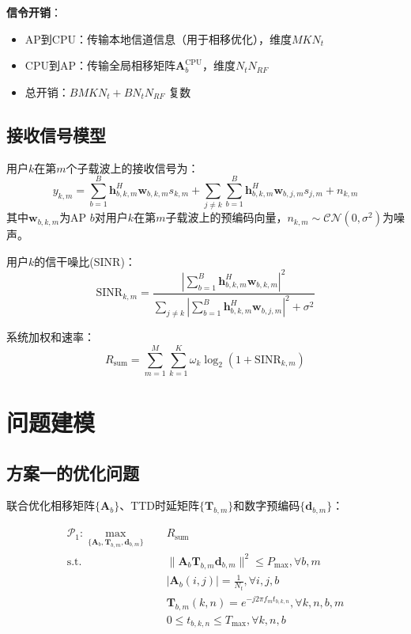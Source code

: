 \documentclass[10pt,twocolumn]{IEEEtran}
\newcommand{\vect}[1]{\mathbf{#1}}
\newcommand{\mat}[1]{\mathbf{#1}}
\begin{document}
\textbf{信令开销}：
\begin{itemize}
\item AP到CPU：传输本地信道信息（用于相移优化），维度$MK N_t$
\item CPU到AP：传输全局相移矩阵$\mat{A}_b^{\text{CPU}}$，维度$N_t N_{RF}$
\item 总开销：$B MK N_t + B N_t N_{RF}$ 复数
\end{itemize}

\subsection{接收信号模型}

用户$k$在第$m$个子载波上的接收信号为：
\begin{equation}
y_{k,m} = \sum_{b=1}^B \vect{h}_{b,k,m}^H \vect{w}_{b,k,m} s_{k,m} + \sum_{j \neq k} \sum_{b=1}^B \vect{h}_{b,k,m}^H \vect{w}_{b,j,m} s_{j,m} + n_{k,m}
\end{equation}
其中$\vect{w}_{b,k,m}$为AP $b$对用户$k$在第$m$子载波上的预编码向量，$n_{k,m} \sim \mathcal{CN}(0, \sigma^2)$为噪声。

用户$k$的信干噪比(SINR)：
\begin{equation}
\text{SINR}_{k,m} = \frac{\left|\sum_{b=1}^B \vect{h}_{b,k,m}^H \vect{w}_{b,k,m}\right|^2}{\sum_{j \neq k}\left|\sum_{b=1}^B \vect{h}_{b,k,m}^H \vect{w}_{b,j,m}\right|^2 + \sigma^2}
\end{equation}

系统加权和速率：
\begin{equation}
R_{\text{sum}} = \sum_{m=1}^M \sum_{k=1}^K \omega_k \log_2(1 + \text{SINR}_{k,m})
\end{equation}

\section{问题建模}

\subsection{方案一的优化问题}

联合优化相移矩阵$\{\mat{A}_b\}$、TTD时延矩阵$\{\mat{T}_{b,m}\}$和数字预编码$\{\vect{d}_{b,m}\}$：

\begin{align}
\mathcal{P}_1: \max_{\{\mat{A}_b, \mat{T}_{b,m}, \vect{d}_{b,m}\}} \quad & R_{\text{sum}} \\
\text{s.t.} \quad & \|\mat{A}_b \mat{T}_{b,m} \vect{d}_{b,m}\|^2 \leq P_{\text{max}}, \forall b, m \\
& |\mat{A}_b(i,j)| = \frac{1}{N_t}, \forall i, j, b \\
& \mat{T}_{b,m}(k,n) = e^{-j2\pi f_m t_{b,k,n}}, \forall k, n, b, m \\
& 0 \leq t_{b,k,n} \leq T_{\text{max}}, \forall k, n, b
\end{align}
\end{document}
